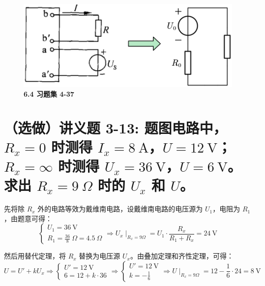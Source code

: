 \documentclass[UTF8]{report}
\theoremstyle{MyLineTheoremStyle} %
\theoremstyle{MyBlockTheoremStyle} %
\theoremstyle{MySubsubsectionStyle} %
\begin{document}
\begin{figure}[H]\centering
\includegraphics[width=0.52\columnwidth]{assets/6/0f2c149b099f73467b72503826e5385d.png}
\caption{\bfseries 6.4 习题集 4-37}\label{6.4 习题集 4-37}
\end{figure}

\section{（选做）讲义题 3-13: 题图电路中，$R_x = 0$ 时测得 $I_x = 8 \ \mathrm{A}$，$U = 12 \ \mathrm{V}$；$R_x = \infty$ 时测得 $U_x = 36 \ \mathrm{V}$，$U = 6 \ \mathrm{V}$。求出 $R_x = 9 \ \Omega$ 时的 $U_x$ 和 $U$。}

先将除 $R_x$ 外的电路等效为戴维南电路，设戴维南电路的电压源为 $U_1$，电阻为 $R_1$，由题意可得：
\begin{equation}
\begin{cases}
    U_1 = 36 \ \mathrm{V} \\ 
    R_1 = \frac{36}{8} \ \Omega = 4.5 \ \Omega
\end{cases}
\Longrightarrow 
\boxed{
    U_x \mid_{R_x = 9 \Omega} = U_1 \cdot \frac{R_x}{R_1 + R_x} = 24 \ \mathrm{V}
}
\end{equation}

然后用替代定理，将 $R_x$ 替换为电压源 $U_x$。由叠加定理和齐性定理，可得：
\begin{equation}
    U = U' + kU_x
    \Longrightarrow 
\begin{cases}
    U' = 12 \ \mathrm{V} \\ 
    6 = 12 + k \cdot 36
\end{cases}
\Longrightarrow 
\begin{cases}
    U' = 12 \ \mathrm{V} \\ 
    k = -\frac{1}{6}
\end{cases}
\Longrightarrow 
\boxed{
    U\mid_{R_x = 9 \Omega} = 12 - \frac{1}{6} \cdot 24 = 8 \ \mathrm{V}
}
\end{equation}
\end{document}
